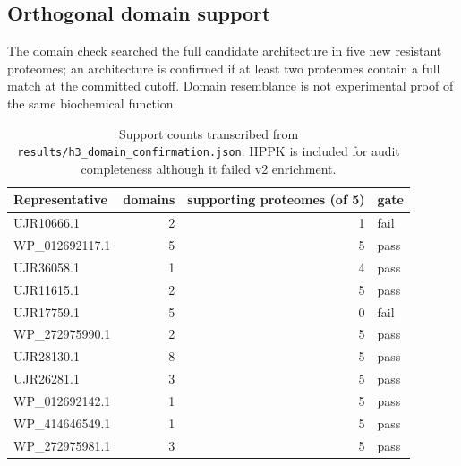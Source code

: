\subsection{Orthogonal domain support}
The domain check searched the full candidate architecture in five new resistant proteomes; an architecture is confirmed if at least two proteomes contain a full match at the committed cutoff. Domain resemblance is not experimental proof of the same biochemical function.\begin{table}[!htbp]\centering\small\caption{Support counts transcribed from \texttt{results/h3\_domain\_confirmation.json}. HPPK is included for audit completeness although it failed v2 enrichment.}\begin{tabular}{lrrl}\hline Representative & domains & supporting proteomes (of 5) & gate \\\hline
UJR10666.1 & 2 & 1 & fail \\
WP\_012692117.1 & 5 & 5 & pass \\
UJR36058.1 & 1 & 4 & pass \\
UJR11615.1 & 2 & 5 & pass \\
UJR17759.1 & 5 & 0 & fail \\
WP\_272975990.1 & 2 & 5 & pass \\
UJR28130.1 & 8 & 5 & pass \\
UJR26281.1 & 3 & 5 & pass \\
WP\_012692142.1 & 1 & 5 & pass \\
WP\_414646549.1 & 1 & 5 & pass \\
WP\_272975981.1 & 3 & 5 & pass \\
\hline\end{tabular}\end{table}
